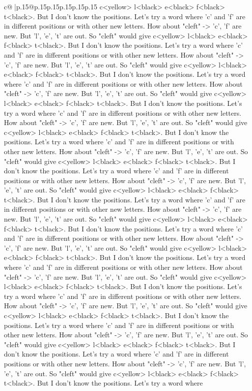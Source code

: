 \documentclass{article}
\begin{document}
{\begin{supertabular}{c@{$\;$}|p{.15\linewidth}@{}p{.15\linewidth}p{.15\linewidth}p{.15\linewidth}p{.15\linewidth}p{.15\linewidth}}
{{{c<yellow> l<black> e<black> f<black> t<black>. But I don't know the positions. Let's try a word where 'c' and 'f' are in different positions or with other new letters. How about "cleft" {-}> 'c', 'f' are new. But 'l', 'e', 't' are out. So "cleft" would give c<yellow> l<black> e<black> f<black> t<black>. But I don't know the positions. Let's try a word where 'c' and 'f' are in different positions or with other new letters. How about "cleft" {-}> 'c', 'f' are new. But 'l', 'e', 't' are out. So "cleft" would give c<yellow> l<black> e<black> f<black> t<black>. But I don't know the positions. Let's try a word where 'c' and 'f' are in different positions or with other new letters. How about "cleft" {-}> 'c', 'f' are new. But 'l', 'e', 't' are out. So "cleft" would give c<yellow> l<black> e<black> f<black> t<black>. But I don't know the positions. Let's try a word where 'c' and 'f' are in different positions or with other new letters. How about "cleft" {-}> 'c', 'f' are new. But 'l', 'e', 't' are out. So "cleft" would give c<yellow> l<black> e<black> f<black> t<black>. But I don't know the positions. Let's try a word where 'c' and 'f' are in different positions or with other new letters. How about "cleft" {-}> 'c', 'f' are new. But 'l', 'e', 't' are out. So "cleft" would give c<yellow> l<black> e<black> f<black> t<black>. But I don't know the positions. Let's try a word where 'c' and 'f' are in different positions or with other new letters. How about "cleft" {-}> 'c', 'f' are new. But 'l', 'e', 't' are out. So "cleft" would give c<yellow> l<black> e<black> f<black> t<black>. But I don't know the positions. Let's try a word where 'c' and 'f' are in different positions or with other new letters. How about "cleft" {-}> 'c', 'f' are new. But 'l', 'e', 't' are out. So "cleft" would give c<yellow> l<black> e<black> f<black> t<black>. But I don't know the positions. Let's try a word where 'c' and 'f' are in different positions or with other new letters. How about "cleft" {-}> 'c', 'f' are new. But 'l', 'e', 't' are out. So "cleft" would give c<yellow> l<black> e<black> f<black> t<black>. But I don't know the positions. Let's try a word where 'c' and 'f' are in different positions or with other new letters. How about "cleft" {-}> 'c', 'f' are new. But 'l', 'e', 't' are out. So "cleft" would give c<yellow> l<black> e<black> f<black> t<black>. But I don't know the positions. Let's try a word where 'c' and 'f' are in different positions or with other new letters. How about "cleft" {-}> 'c', 'f' are new. But 'l', 'e', 't' are out. So "cleft" would give c<yellow> l<black> e<black> f<black> t<black>. But I don't know the positions. Let's try a word where 'c' and 'f' are in different positions or with other new letters. How about "cleft" {-}> 'c', 'f' are new. But 'l', 'e', 't' are out. So "cleft" would give c<yellow> l<black> e<black> f<black> t<black>. But I don't know the positions. Let's try a word where 'c' and 'f' are in different positions or with other new letters. How about "cleft" {-}> 'c', 'f' are new. But 'l', 'e', 't' are out. So "cleft" would give c<yellow> l<black> e<black> f<black> t<black>. But I don't know the positions. Let's try a word where }}}
\end{supertabular}}
\end{document}
